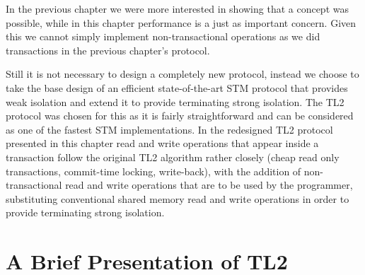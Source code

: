 In the previous chapter we were more interested in showing that a concept was
possible, while in this chapter performance is a just as important concern.
Given this we cannot simply implement non-transactional
operations as we did transactions in the previous chapter's protocol.

Still it is not necessary to design a completely new protocol, instead we
choose to take the base design of an efficient state-of-the-art STM protocol
that provides weak isolation and extend it to provide terminating strong isolation.
The TL2 protocol was chosen for this as it is fairly straightforward
and can be considered as one of the fastest STM implementations.
In the redesigned TL2 protocol presented in this chapter
 read   and write operations that appear inside a 
transaction follow the original TL2 algorithm rather closely (cheap read 
only transactions, commit-time locking, write-back), 
with the addition of non-transactional read and  write operations 
that are to be used 
by the programmer, substituting conventional
shared memory read and write operations in order to provide
terminating strong isolation. 




\section{A Brief Presentation of TL2}
\label{sec:tl2}


